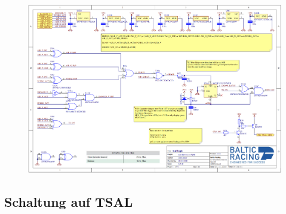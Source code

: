\begin{figure}
	\centering
	\includegraphics[width=0.7\linewidth]{"bilder/TSAL Logik AMS Master"}
	\caption{}
	\label{fig:tsal-logik-ams-master}
\end{figure}

\FloatBarrier
\subsection{Schaltung auf TSAL}
